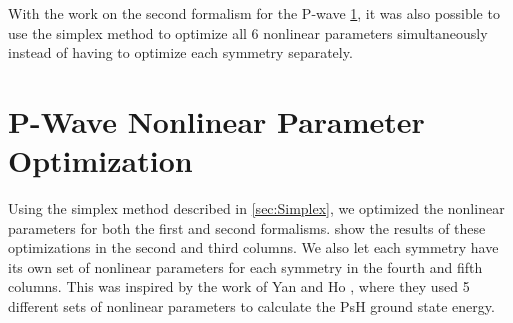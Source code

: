 \documentclass[Dissertation.tex]{subfiles}
\begin{document}
With the work on the second formalism for the P-wave \cref{sec:PWaveOpt}, it 
was also possible to use the simplex method to optimize all 6 nonlinear 
parameters simultaneously instead of having to optimize each symmetry 
separately. %


\section{P-Wave Nonlinear Parameter Optimization}
\label{sec:PWaveOpt}

Using the simplex method described in \cref{sec:Simplex}, we optimized the nonlinear parameters for both the first and second formalisms.  show the results of these optimizations in the second and third columns. We also let each symmetry have its own set of nonlinear parameters for each symmetry in the fourth and fifth columns. This was inspired by the work of Yan and Ho \cite{Yan1999}, where they used 5 different sets of nonlinear parameters to calculate the PsH ground state energy.
\end{document}
